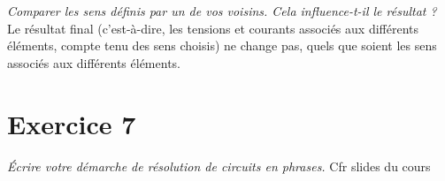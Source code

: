 {%
\textit{Comparer les sens définis par un de vos voisins. Cela influence-t-il le résultat ?}
}
{%
Le résultat final (c'est-à-dire, les tensions et courants associés aux différents éléments, compte tenu des sens choisis) ne change pas, quels que soient les sens associés aux différents éléments.
}

\newpage
\section{Exercice 7}
{%
\textit{Écrire votre démarche de résolution de circuits en phrases.}
}
{%
Cfr slides du cours
}

